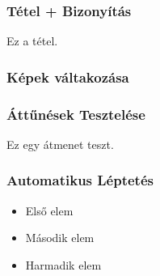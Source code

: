 \documentclass[12pt,16:9]{beamer}
\begin{document}
\begin{frame}
    \frametitle{Tétel + Bizonyítás}
    \begin{theorem}
        Ez a tétel.
    \end{theorem}
\end{frame}

\begin{frame}
    \frametitle{Képek váltakozása}
\end{frame}

\begin{frame}
    \frametitle{Áttűnések Tesztelése}
    Ez egy átmenet teszt.
\end{frame}

\begin{frame}
    \frametitle{Automatikus Léptetés}
    \begin{itemize}
        \item<1-> Első elem
        \item<2-> Második elem
        \item<3-> Harmadik elem
    \end{itemize}
\end{frame}
\end{document}
